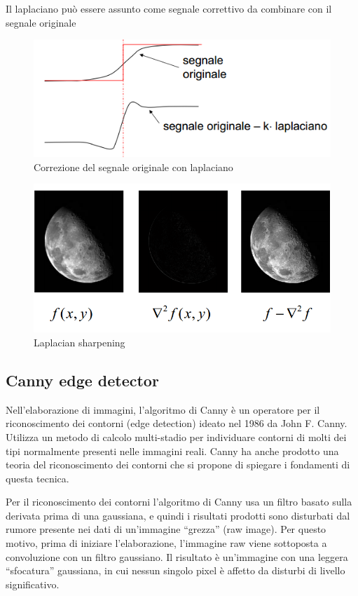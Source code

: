 Il laplaciano può essere assunto come segnale correttivo da combinare con il segnale originale

\begin{figure}[h]
\centering
\includegraphics[width=.8\textwidth]{img/laplaciano-correttivo.png}
\caption{Correzione del segnale originale con laplaciano}
\label{fig:laplaciano-correttivo}
\end{figure}

\begin{figure}[h]
\centering
\includegraphics[width=.8\textwidth]{img/laplacian-sharpening.png}
\caption{Laplacian sharpening}
\label{fig:laplacian-sharpening}
\end{figure}

\subsection{Canny edge detector}
Nell'elaborazione di immagini, l'algoritmo di Canny\cite{Canny:1986:CAE:11274.11275} è un operatore per il riconoscimento dei contorni (edge detection) ideato nel 1986 da John F. Canny. Utilizza un metodo di calcolo multi-stadio per individuare contorni di molti dei tipi normalmente presenti nelle immagini reali. Canny ha anche prodotto una teoria del riconoscimento dei contorni che si propone di spiegare i fondamenti di questa tecnica.

Per il riconoscimento dei contorni l'algoritmo di Canny usa un filtro basato sulla derivata prima di una gaussiana, e quindi i risultati prodotti sono disturbati dal rumore presente nei dati di un'immagine ``grezza'' (raw image). Per questo motivo, prima di iniziare l'elaborazione, l'immagine raw viene sottoposta a convoluzione con un filtro gaussiano. Il risultato è un'immagine con una leggera ``sfocatura'' gaussiana, in cui nessun singolo pixel è affetto da disturbi di livello significativo.

